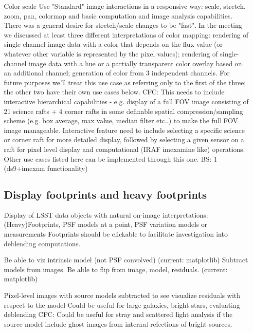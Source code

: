 Color scale
Use "Standard" image interactions in a responsive way: scale, stretch, zoom, pan, colormap and basic computation and image analysis capabilities.
There was a general desire for stretch/scale changes to be "fast".
In the meeting we discussed at least three different interpretations of color mapping: rendering of single-channel image data with a color that depends on the flux value (or whatever other variable is represented by the pixel values); rendering of single-channel image data with a hue or a partially transparent color overlay based on an additional channel; generation of color from 3 independent channels. For future purposes we'll treat this use case as referring only to the first of the three; the other two have their own use cases below.
CFC: This needs to include interactive hierarchical capabilities - e.g. display of a full FOV image consisting of 21 science rafts + 4 corner rafts in some definable spatial compression/sampling scheme (e.g. box average, max value, median filter etc..) to make the full FOV image manageable. Interactive feature need to include selecting a specific science or corner raft for more detailed display, followed by selecting a given sensor on a raft for pixel level display and computational (IRAF imexamine like) operations.
Other use cases listed here can be implemented through this one.
BS: 1 (ds9+imexam functionality)


\subsection{Display footprints and heavy footprints}
Display of LSST data objects with natural on-image interpretations: (Heavy)Footprints, PSF models at a point, PSF variation models or measurements
Footprints should be clickable to facilitate investigation into deblending computations.

Be able to viz intrinsic model (not PSF convolved) (current: matplotlib)
Subtract models from images. Be able to flip from image, model, residuals.   (current: matplotlib)

Pixel-level images with source models subtracted to see visualize residuals with respect to the model
Could be useful for large galaxies, bright stars, evaluating deblending
CFC: Could be useful for stray and scattered light analysis if the source model include ghost images from internal refections of bright sources.

